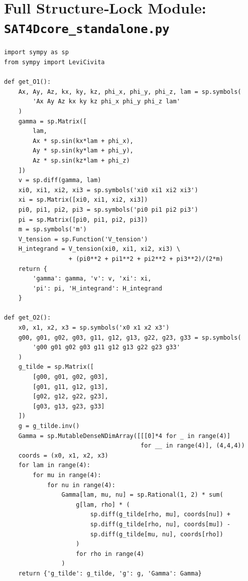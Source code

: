 \usepackage{listings}
\lstset{
  language=Python,
  basicstyle=\footnotesize\ttfamily,
  frame=single,
  numbers=left,
  numberstyle=\tiny,
  breaklines=true,
  captionpos=b
}


\appendix
\section{Full Structure‐Lock Module: \texttt{SAT4Dcore\_standalone.py}}

\begin{lstlisting}[caption={SAT4Dcore\_standalone.py — O1–O8 structure locks}]
import sympy as sp
from sympy import LeviCivita

def get_O1():
    Ax, Ay, Az, kx, ky, kz, phi_x, phi_y, phi_z, lam = sp.symbols(
        'Ax Ay Az kx ky kz phi_x phi_y phi_z lam'
    )
    gamma = sp.Matrix([
        lam,
        Ax * sp.sin(kx*lam + phi_x),
        Ay * sp.sin(ky*lam + phi_y),
        Az * sp.sin(kz*lam + phi_z)
    ])
    v = sp.diff(gamma, lam)
    xi0, xi1, xi2, xi3 = sp.symbols('xi0 xi1 xi2 xi3')
    xi = sp.Matrix([xi0, xi1, xi2, xi3])
    pi0, pi1, pi2, pi3 = sp.symbols('pi0 pi1 pi2 pi3')
    pi = sp.Matrix([pi0, pi1, pi2, pi3])
    m = sp.symbols('m')
    V_tension = sp.Function('V_tension')
    H_integrand = V_tension(xi0, xi1, xi2, xi3) \
                  + (pi0**2 + pi1**2 + pi2**2 + pi3**2)/(2*m)
    return {
        'gamma': gamma, 'v': v, 'xi': xi,
        'pi': pi, 'H_integrand': H_integrand
    }

def get_O2():
    x0, x1, x2, x3 = sp.symbols('x0 x1 x2 x3')
    g00, g01, g02, g03, g11, g12, g13, g22, g23, g33 = sp.symbols(
        'g00 g01 g02 g03 g11 g12 g13 g22 g23 g33'
    )
    g_tilde = sp.Matrix([
        [g00, g01, g02, g03],
        [g01, g11, g12, g13],
        [g02, g12, g22, g23],
        [g03, g13, g23, g33]
    ])
    g = g_tilde.inv()
    Gamma = sp.MutableDenseNDimArray([[[0]*4 for _ in range(4)] 
                                      for __ in range(4)], (4,4,4))
    coords = (x0, x1, x2, x3)
    for lam in range(4):
        for mu in range(4):
            for nu in range(4):
                Gamma[lam, mu, nu] = sp.Rational(1, 2) * sum(
                    g[lam, rho] * (
                        sp.diff(g_tilde[rho, mu], coords[nu]) +
                        sp.diff(g_tilde[rho, nu], coords[mu]) -
                        sp.diff(g_tilde[mu, nu], coords[rho])
                    )
                    for rho in range(4)
                )
    return {'g_tilde': g_tilde, 'g': g, 'Gamma': Gamma}


\end{lstlisting}
